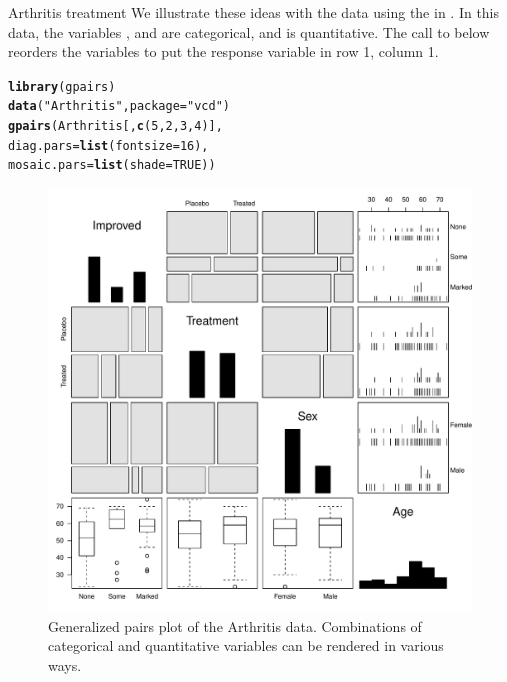 \documentclass[11pt]{book}\usepackage[]{graphicx}\usepackage[]{color}
\makeatletter
\newcommand{\hlnum}[1]{\textcolor[rgb]{0.686,0.059,0.569}{#1}}%
\newcommand{\hlstr}[1]{\textcolor[rgb]{0.192,0.494,0.8}{#1}}%
\newcommand{\hlstd}[1]{\textcolor[rgb]{0.345,0.345,0.345}{#1}}%
\newcommand{\hlkwc}[1]{\textcolor[rgb]{0.333,0.667,0.333}{#1}}%
\newcommand{\hlkwd}[1]{\textcolor[rgb]{0.737,0.353,0.396}{\textbf{#1}}}%
\newenvironment{kframe}{%
 \def\at@end@of@kframe{}%
 \ifinner\ifhmode%
  \def\at@end@of@kframe{\end{minipage}}%
  \begin{minipage}{\columnwidth}%
 \fi\fi%
 \def\FrameCommand##1{\hskip\@totalleftmargin \hskip-\fboxsep
 \colorbox{shadecolor}{##1}\hskip-\fboxsep
     \hskip-\linewidth \hskip-\@totalleftmargin \hskip\columnwidth}%
 \MakeFramed {\advance\hsize-\width
   \@totalleftmargin\z@ \linewidth\hsize
   \@setminipage}}%
 {\par\unskip\endMakeFramed%
 \at@end@of@kframe}
\newenvironment{knitrout}{}{} %
\renewenvironment{knitrout}{\small\renewcommand{\baselinestretch}{.85}}{} %
\makeatother
\begin{document}
\begin{Example}{Arthritis treatment}
We illustrate these ideas with the  data using the 
 in .
In this data, the variables ,  and  are
categorical, and  is quantitative.
The call to  below reorders the variables to put the response variable
 in row 1, column 1.
\begin{knitrout}
\color{fgcolor}\begin{kframe}
\begin{alltt}
\hlkwd{library}\hlstd{(gpairs)}
\hlkwd{data}\hlstd{(}\hlstr{"Arthritis"}\hlstd{,} \hlkwc{package}\hlstd{=}\hlstr{"vcd"}\hlstd{)}
\hlkwd{gpairs}\hlstd{(Arthritis[,}\hlkwd{c}\hlstd{(}\hlnum{5}\hlstd{,}\hlnum{2}\hlstd{,}\hlnum{3}\hlstd{,}\hlnum{4}\hlstd{)],}
       \hlkwc{diag.pars}\hlstd{=}\hlkwd{list}\hlstd{(}\hlkwc{fontsize} \hlstd{=} \hlnum{16}\hlstd{),}
       \hlkwc{mosaic.pars}\hlstd{=}\hlkwd{list}\hlstd{(}\hlkwc{shade}\hlstd{=}\hlnum{TRUE}\hlstd{))}
\end{alltt}
\end{kframe}\begin{figure}[!htb]


\centerline{\includegraphics[width=.9\textwidth]{ch05/fig/arth-gpairs} }

\caption[Generalized pairs plot of the Arthritis data]{Generalized pairs plot of the Arthritis data. Combinations of categorical and quantitative variables can be rendered in various ways.\label{fig:arth-gpairs}}
\end{figure}



\end{knitrout}
\end{Example}
\end{document}
